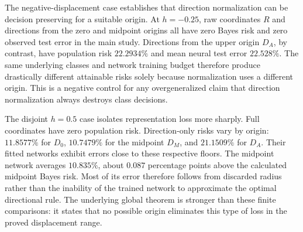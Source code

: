 \documentclass[12pt,a4paper]{article}
\begin{document}
The negative-displacement case establishes that direction normalization can be decision preserving for a suitable origin. At \(h=-0.25\), raw coordinates \(R\) and directions from the zero and midpoint origins all have zero Bayes risk and zero observed test error in the main study. Directions from the upper origin \(D_A\), by contrast, have population risk \(22.2934\%\) and mean neural test error \(22.528\%\). The same underlying classes and network training budget therefore produce drastically different attainable risks solely because normalization uses a different origin. This is a negative control for any overgeneralized claim that direction normalization always destroys class decisions.

The disjoint \(h=0.5\) case isolates representation loss more sharply. Full coordinates have zero population risk. Direction-only risks vary by origin: \(11.8577\%\) for \(D_0\), \(10.7479\%\) for the midpoint \(D_M\), and \(21.1509\%\) for \(D_A\). Their fitted networks exhibit errors close to these respective floors. The midpoint network averages \(10.835\%\), about \(0.087\) percentage points above the calculated midpoint Bayes risk. Most of its error therefore follows from discarded radius rather than the inability of the trained network to approximate the optimal directional rule. The underlying global theorem is stronger than these finite comparisons: it states that no possible origin eliminates this type of loss in the proved displacement range.
\end{document}
